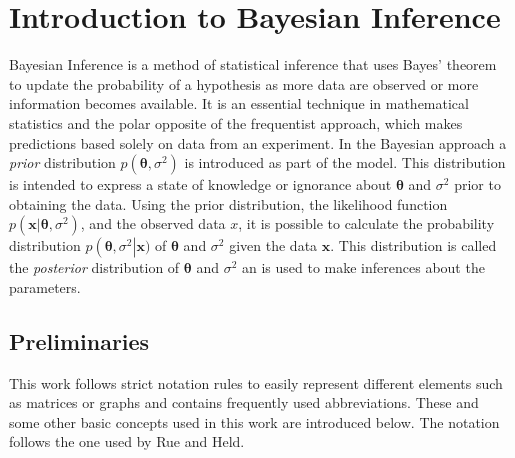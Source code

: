 %
\chapter{Introduction to Bayesian Inference}
\label{sec:bayes}
Bayesian Inference is a method of statistical inference that uses Bayes' theorem to update the probability of a hypothesis as more data are observed or more information becomes available. It is an essential technique in mathematical statistics and the polar opposite of the frequentist approach, which makes predictions based solely on data from an experiment. In the Bayesian approach a \textit{prior} distribution $p\left(\pmb{\theta}, \sigma^2\right)$ is introduced as part of the model. This distribution is intended to express a state of knowledge or ignorance about $\pmb{\theta}$ and $\sigma^2$ prior to obtaining the data. Using the prior distribution, the likelihood function $p\left(\pmb{x}|\pmb{\theta},\sigma^2\right)$, and the observed data $x$, it is possible to calculate the probability distribution $p\left(\pmb{\theta},\sigma^2\right|\pmb{x})$ of $\pmb{\theta}$ and $\sigma^2$ given the data $\pmb{x}$. This distribution is called the \textit{posterior} distribution of $\pmb{\theta}$ and $\sigma^2$ an is used to make inferences about the parameters\autocite[Cf.][]{box2011bayesian}.
\section{Preliminaries}
This work follows strict notation rules to easily represent different elements such as matrices or graphs and contains frequently used abbreviations. These and some other basic concepts used in this work are introduced below. The notation follows the one used by Rue and Held\autocite[Cf.][]{rue2005gaussian}.
